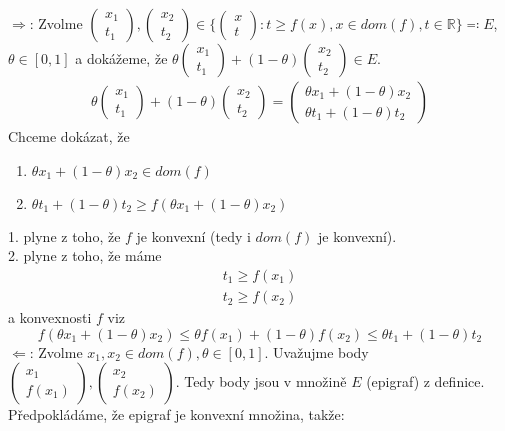 \documentclass[12pt, a4paper]{article}
\begin{document}
\section{}
$\Rightarrow$: Zvolme $\begin{pmatrix} x_1 \\ t_1\end{pmatrix}, \begin{pmatrix} x_2 \\ t_2\end{pmatrix} \in \{\begin{pmatrix} x \\ t\end{pmatrix}: t \geq f(x), x \in dom(f), t \in \mathbb{R} \} \eqqcolon E$, $\theta \in [0,1]$ a dokážeme, že $\theta \begin{pmatrix} x_1 \\ t_1\end{pmatrix} + (1-\theta) \begin{pmatrix} x_2 \\ t_2\end{pmatrix} \in E$.
\begin{gather*}
\theta \begin{pmatrix} x_1 \\ t_1\end{pmatrix} + (1-\theta) \begin{pmatrix} x_2 \\ t_2\end{pmatrix} = \begin{pmatrix} \theta x_1 + (1-\theta) x_2 \\ \theta t_1 + (1-\theta) t_2\end{pmatrix}
\end{gather*}
Chceme dokázat, že 
\begin{enumerate}
\item $\theta x_1 + (1-\theta) x_2 \in dom(f)$
\item $\theta t_1 + (1-\theta) t_2 \geq f(\theta x_1 + (1-\theta) x_2)$
\end{enumerate}
1. plyne z toho, že $f$ je konvexní (tedy i $dom(f)$ je konvexní).\\
2. plyne z toho, že máme
\begin{gather*}
t_1 \geq f(x_1)\\
t_2 \geq f(x_2)
\end{gather*}
a konvexnosti $f$ viz
\[
f(\theta x_1 + (1-\theta) x_2) \leq \theta f(x_1) + (1-\theta)f(x_2) \leq \theta t_1 + (1-\theta) t_2
\]
$\Leftarrow$:
Zvolme $x_1, x_2 \in dom(f), \theta \in [0,1]$. Uvažujme body $\begin{pmatrix} x_1 \\ f(x_1)\end{pmatrix}, \begin{pmatrix} x_2 \\ f(x_2)\end{pmatrix}$. Tedy body jsou v množině $E$ (epigraf) z definice. Předpokládáme, že epigraf je konvexní množina, takže:
\end{document}
